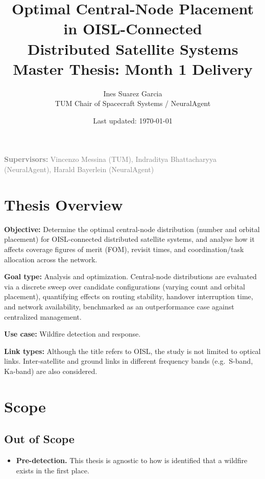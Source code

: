 \documentclass[11pt]{article}
\title{\textbf{Optimal Central-Node Placement in OISL-Connected \\ Distributed Satellite Systems} \\[0.3cm] \large Master Thesis: Month 1 Delivery}
\author{Ines Suarez Garcia \\ TUM Chair of Spacecraft Systems / NeuralAgent}
\date{Last updated: \today}
\begin{document}
\maketitle

\begin{center}
\textcolor{gray}{\textbf{Supervisors:} Vincenzo Messina (TUM), Indraditya Bhattacharyya (NeuralAgent), Harald Bayerlein (NeuralAgent)}
\end{center}

\vspace{0.5cm}

\section{Thesis Overview}

\textbf{Objective:} Determine the optimal central-node distribution (number and orbital placement) for OISL-connected distributed satellite systems, and analyse how it affects coverage figures of merit (FOM), revisit times, and coordination/task allocation across the network.

\textbf{Goal type:} Analysis and optimization. Central-node distributions are evaluated via a discrete sweep over candidate configurations (varying count and orbital placement), quantifying effects on routing stability, handover interruption time, and network availability, benchmarked as an outperformance case against centralized management.

\textbf{Use case:} Wildfire detection and response.

\textbf{Link types:} Although the title refers to OISL, the study is not limited to optical links. Inter-satellite and ground links in different frequency bands (e.g.\ S-band, Ka-band) are also considered.

\section{Scope}

\subsection{Out of Scope}
\begin{itemize}[leftmargin=1.2cm]
    \item \textbf{Pre-detection.} This thesis is agnostic to how is identified that a wildfire exists in the first place.
\end{itemize}
\end{document}
